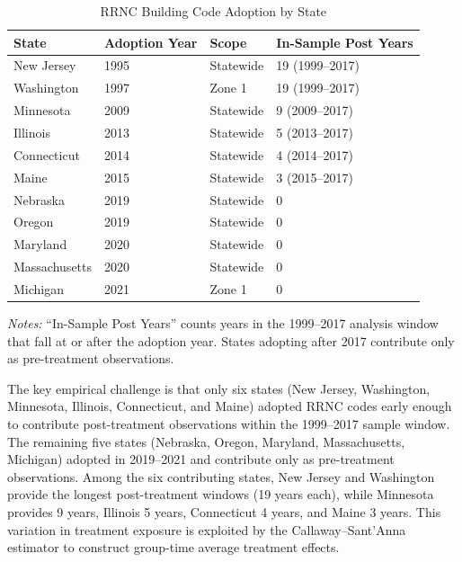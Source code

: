 \documentclass[12pt]{article}
\begin{document}
\begin{table}[H]
\centering
\caption{RRNC Building Code Adoption by State}
\begin{threeparttable}
\begin{tabular}{llll}
\toprule
State & Adoption Year & Scope & In-Sample Post Years \\
\midrule
New Jersey & 1995 & Statewide & 19 (1999--2017) \\
Washington & 1997 & Zone 1 & 19 (1999--2017) \\
Minnesota & 2009 & Statewide & 9 (2009--2017) \\
Illinois & 2013 & Statewide & 5 (2013--2017) \\
Connecticut & 2014 & Statewide & 4 (2014--2017) \\
Maine & 2015 & Statewide & 3 (2015--2017) \\
Nebraska & 2019 & Statewide & 0 \\
Oregon & 2019 & Statewide & 0 \\
Maryland & 2020 & Statewide & 0 \\
Massachusetts & 2020 & Statewide & 0 \\
Michigan & 2021 & Zone 1 & 0 \\
\bottomrule
\end{tabular}
\begin{tablenotes}[flushleft]
\small
\item \textit{Notes:} ``In-Sample Post Years'' counts years in the 1999--2017 analysis window that fall at or after the adoption year. States adopting after 2017 contribute only as pre-treatment observations.
\end{tablenotes}
\end{threeparttable}
\label{tab:rrnc_adoption}
\end{table}

The key empirical challenge is that only six states (New Jersey, Washington, Minnesota, Illinois, Connecticut, and Maine) adopted RRNC codes early enough to contribute post-treatment observations within the 1999--2017 sample window. The remaining five states (Nebraska, Oregon, Maryland, Massachusetts, Michigan) adopted in 2019--2021 and contribute only as pre-treatment observations. Among the six contributing states, New Jersey and Washington provide the longest post-treatment windows (19 years each), while Minnesota provides 9 years, Illinois 5 years, Connecticut 4 years, and Maine 3 years. This variation in treatment exposure is exploited by the Callaway--Sant'Anna estimator to construct group-time average treatment effects.
\end{document}

